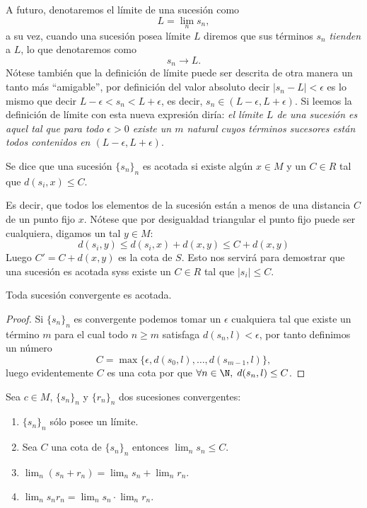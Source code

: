 \documentclass[11pt,oneside,a4paper]{book}
\begin{document}
A futuro, denotaremos el límite de una sucesión como
$$L=\lim_n s_n,$$
a su vez, cuando una sucesión posea límite $L$ diremos que sus términos $s_n$ \textit{tienden} a $L$, lo que denotaremos como
$$s_n\to L.$$
Nótese también que la definición de límite puede ser descrita de otra manera un tanto más ``amigable'', por definición del valor absoluto decir $|s_n-L|\lt\epsilon$ es lo mismo que decir $L-\epsilon\lt s_n\lt L+\epsilon$, es decir, $s_n\in(L-\epsilon,L+\epsilon)$. Si leemos la definición de límite con esta nueva expresión diría: \textit{el límite $L$ de una sucesión es aquel tal que para todo $\epsilon\gt 0$ existe un $m$ natural cuyos términos sucesores están todos contenidos en $(L-\epsilon,L+\epsilon)$}.
\begin{mydef}[Acotado]
Se dice que una sucesión $\{s_n\}_n$ es acotada si existe algún $x\in M$ y un $C\in R$ tal que $d(s_i,x)\leq C$.
\end{mydef}
Es decir, que todos los elementos de la sucesión están a menos de una distancia $C$ de un punto fijo $x$. Nótese que por desigualdad triangular el punto fijo puede ser cualquiera, digamos un tal $y\in M$:
$$d(s_i,y)\leq d(s_i,x)+d(x,y)\leq C+d(x,y)$$
Luego $C'=C+d(x,y)$ es la cota de $S$. Esto nos servirá para demostrar que una sucesión es acotada syss existe un $C\in R$ tal que $|s_i|\leq C$.
\begin{thm}
Toda sucesión convergente es acotada.
\end{thm}
\begin{proof}
Si $\{s_n\}_n$ es convergente podemos tomar un $\epsilon$ cualquiera tal que existe un término $m$ para el cual todo $n\geq m$ satisfaga $d(s_n,l)\lt\epsilon$, por tanto definimos un número
$$C=\max\{\epsilon,d(s_0,l),\dots,d(s_{m-1},l)\},$$
luego evidentemente $C$ es una cota por que $\forall n\in\N,\;d(s_n,l)\leq C$.
\end{proof}
\begin{thm}
Sea $c\in M$, $\{s_n\}_n$ y $\{r_n\}_n$ dos sucesiones convergentes:
\begin{enumerate}[$a$)]
\item $\{s_n\}_n$ sólo posee un límite.
\item Sea $C$ una cota de $\{s_n\}_n$ entonces $\lim_n s_n\leq C$.
\item $\lim_n (s_n+r_n)=\lim_n s_n+\lim_n r_n$.
\item $\lim_n s_nr_n=\lim_n s_n\cdot\lim_n r_n$.
\end{enumerate}
\end{thm}
\end{document}
